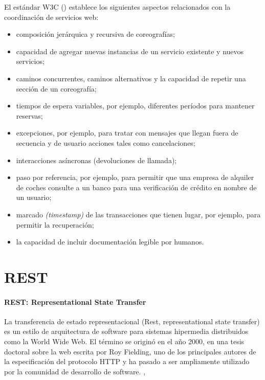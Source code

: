El est\'andar W3C (\cite{W3C2022}) establece los siguientes aspectos relacionados con la coordinación de servicios web:
\begin{itemize} 
	\item composición jerárquica y recursiva de coreografías;
	\item capacidad de agregar nuevas instancias de un servicio existente y nuevos servicios;
	\item caminos concurrentes, caminos alternativos y la capacidad de repetir una sección de un coreografía;
	\item tiempos de espera variables, por ejemplo, diferentes períodos para mantener reservas;
	\item excepciones, por ejemplo, para tratar con mensajes que llegan fuera de secuencia y de usuario 	acciones tales como cancelaciones;
 
	\item interacciones asíncronas (devoluciones de llamada);
	\item paso por referencia, por ejemplo, para permitir que una empresa de alquiler de coches consulte a un banco para una verificación de crédito en nombre de un usuario;
	\item  marcado \textit{(timestamp)} de las transacciones  que tienen lugar, por ejemplo, para permitir la recuperación;
	\item la capacidad de incluir documentación legible por humanos.
\end{itemize}

  \section{REST}
  
  	\paragraph{REST: Representational State Transfer}
   La transferencia de estado representacional (Rest, representational state transfer)  es un estilo de arquitectura de software para sistemas hipermedia distribuidos como la World Wide Web. El término se originó en el año 2000, en una tesis doctoral sobre la web escrita por Roy Fielding, uno de los principales autores de la especificación del protocolo HTTP y ha pasado a ser ampliamente utilizado por la comunidad de desarrollo de software. 
		\cite{Fielding2000}, \cite{Erl2013}
		\cite{DimitriosGeorgakopoulos2009} 
		\cite{Barry2013}
		

